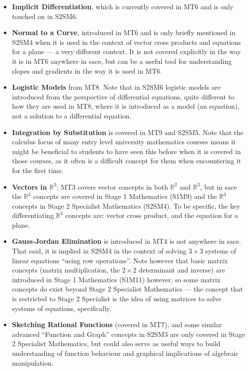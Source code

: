 \documentclass[twoside,12pt,a4paper]{report}
\begin{document}
\begin{itemize}
	\item \textbf{Implicit Differentiation}, which is currently covered in MT6 and is only touched on in S2SM6.
	\item \textbf{Normal to a Curve}, introduced in MT6 and is only briefly mentioned in S2SM4 when it is used in the context of vector cross products and equations for a plane --- a very different context. It is not covered explicitly in the way it is in MT6 anywhere in \gls{sace}, but can be a useful tool for understanding slopes and gradients in the way it is used in MT6.
	\item \textbf{Logistic Models} from MT8. Note that in S2SM6 logistic models are introduced from the perspective of differential equations, quite different to how they are used in MT8, where it is introduced as a model (an equation), not a solution to a differential equation.
	\item \textbf{Integration by Substitution} is covered in MT9 and S2SM5. Note that the calculus focus of many entry level university mathematics courses means it might be beneficial to students to have seen this before when it is covered in those courses, as it often is a difficult concept for them when encountering it for the first time.
	\item \textbf{Vectors in $\mathbb{R}^3$}: MT3 covers vector concepts in both $\mathbb{R}^2$ and $\mathbb{R}^3$, but in \gls{sace} the $\mathbb{R}^2$ concepts are covered in Stage 1 Mathematics (S1M9) and the $\mathbb{R}^3$ concepts in Stage 2 Specialist Mathematics (S2SM4). To be specific, the key differentiating $\mathbb{R}^3$ concepts are: vector cross product, and the equation for a plane.
	\item \textbf{Gauss-Jordan Elimination} is introduced in MT4 is not anywhere in \gls{sace}. That said, it is implied in S2SM4 in the context of solving $3 \times 3$ systems of linear equations ``using row operations''. Note however that basic matrix concepts (matrix multiplication, the $2\times2$ determinant and inverse) are introduced in Stage 1 Mathematics (S1M11) however, so some matrix concepts do exist beyond Stage 2 Specialist Mathematics --- the concept that is restricted to Stage 2 Specialist is the idea of using matrices to solve systems of equations, specifically. 
	\item \textbf{Sketching Rational Functions} (covered in MT7), and some similar advanced ``Function and Graph'' concepts in S2SM3 are only covered in Stage 2 Specialist Mathematics, but could also serve as useful ways to build understanding of function behaviour and graphical implications of algebraic manipulation.
\end{itemize}
\end{document}
